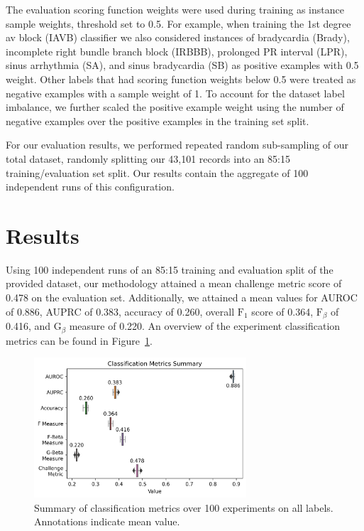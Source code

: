 \documentclass[twocolumn]{cinc}
\begin{document}
The evaluation scoring function weights were used during training as instance sample weights, threshold set to 0.5.
For example, when training the 1st degree av block (IAVB) classifier we also considered instances of bradycardia (Brady), incomplete right bundle branch block (IRBBB), prolonged PR interval (LPR), sinus arrhythmia (SA), and sinus bradycardia (SB) as positive examples with 0.5 weight.
Other labels that had scoring function weights below 0.5 were treated as negative examples with a sample weight of 1.
To account for the dataset label imbalance, we further scaled the positive example weight using the number of negative examples over the positive examples in the training set split.

For our evaluation results, we performed repeated random sub-sampling of our total dataset, randomly splitting our 43,101 records into an 85:15 training/evaluation set split.
Our results contain the aggregate of 100 independent runs of this configuration.

\section{Results}

Using 100 independent runs of an 85:15 training and evaluation split of the provided dataset, our methodology attained a mean challenge metric score of 0.478 on the evaluation set.
Additionally, we attained a mean values for AUROC of 0.886, AUPRC of 0.383, accuracy of 0.260, overall $\text{F}_1$ score of 0.364, $\text{F}_\beta$ of 0.416, and $\text{G}_\beta$ measure of 0.220.
An overview of the experiment classification metrics can be found in Figure~\ref{fig:classification_metrics_summary}.

\begin{figure}[ht]
  \centering
  \includegraphics[width=7.9cm]{fig/classification_metrics.png}
  \caption{Summary of classification metrics over 100 experiments on all labels. Annotations indicate mean value.}
  \label{fig:classification_metrics_summary}
\end{figure}
\end{document}

